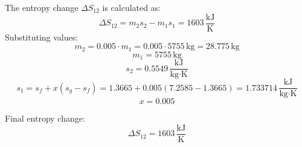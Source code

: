The entropy change \( \Delta S_{12} \) is calculated as:  
\[
\Delta S_{12} = m_2 s_2 - m_1 s_1 = 1603 \, \frac{\text{kJ}}{\text{K}}
\]  
Substituting values:  
\[
m_2 = 0.005 \cdot m_1 = 0.005 \cdot 5755 \, \text{kg} = 28.775 \, \text{kg}
\]  
\[
m_1 = 5755 \, \text{kg}
\]  
\[
s_2 = 0.5549 \, \frac{\text{kJ}}{\text{kg·K}}
\]  
\[
s_1 = s_f + x (s_g - s_f) = 1.3665 + 0.005 (7.2585 - 1.3665) = 1.733714 \, \frac{\text{kJ}}{\text{kg·K}}
\]  
\[
x = 0.005
\]  

Final entropy change:  
\[
\Delta S_{12} = 1603 \, \frac{\text{kJ}}{\text{K}}
\]